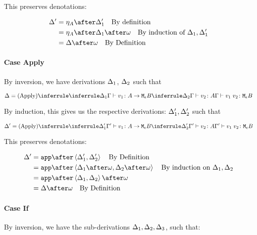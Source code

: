 {    This preserves denotations:
    
    \begin{align}
        \D' & = \point{A}\after\D_1' \qt{By definition}\\
            & = \point{A}\after\D_1\after\w\qt{By induction of $\D_1, \D_1'$}\\
            & = \D\after\w\qt{By Definition}
    \end{align}
    
    \paragraph{Case Apply}
        By inversion, we have derivations $\Delta_1$, $\Delta_2$ such that
    
        \begin{equation}
            \D = 
            \ntreeruleII{Apply}{
                \treeruleI{\D_1}{\gtyperelation{v_1}{\aeb}}
                }{
                \treeruleI{\D_2}{\gtyperelation{v_2}{A}}
            } {
                \gtyperelation{\apply{v_1}{v_2}}{\meb}
            }
        \end{equation}
    
        By induction, this gives us the respective derivations: $\Delta_1',\Delta_2'$ such that
    
        
        \begin{equation}
            \D' = 
            \ntreeruleII{Apply}{
                \treeruleI{\D_1'}{\typerelation{\G'}{v_1}{\aeb}}
                }{
                \treeruleI{\D_2'}{\typerelation{\G'}{v_2}{A}}
            } {
                \typerelation{\G'}{\apply{v_1}{v_2}}{\meb}
            }
        \end{equation}
    
        This preserves denotations:
    
        \begin{align}
            \D' &= \app\after\pr{\D_1'}{\D_2'} \qt{By Definition}\\
            &= \app\after\pr{\D_1\after\w}{\D_2\after\w} \qt{By induction on $\D_1, \D_2$}\\
            &= \app\after\pr{\D_1}{\D_2}\after\w\\
            &= \D\after\w\qt{By Definition}
        \end{align}
    \paragraph{Case If}
    By inversion, we have the sub-derivations $\Delta_1,\Delta_2,\Delta_3$, such that:
    
}
